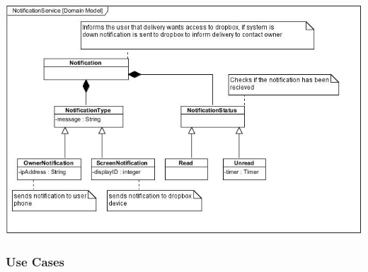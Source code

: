 \documentclass[a4paper,12pt]{article}
\begin{document}
	\includegraphics[width=1\textwidth]{./Pictures/UML/NotificationServiceDomain.jpg}\\[0cm]	
	
	{\noindent}
	
	\newpage
	\subsubsection{Use Cases}
	
\end{document}
